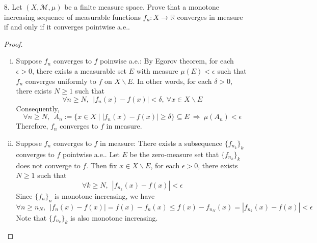 \begin{itemize}
	\item[8.] Let $(X,\mathcal{M}, \mu)$ be a finite measure space. Prove that a monotone increasing sequence
	of measurable functions $f_n : X \rightarrow \mathbb{R}$ converges in measure if and only if it converges pointwise
	a.e..
	\begin{proof}
		\begin{enumerate}[(i)]
			\item Suppose $f_n$ converges to $f$ poinwise a.e.: By Egorov theorem, for each $\epsilon > 0$, there exists a measurable set $E$ with measure $\mu(E) < \epsilon$ such that $f_n$ converges uniformly to $f$ on $X\backslash E$. In other words, for each $\delta > 0$, there exists $N\ge 1$ such that 
			$$
			\forall n\ge N,~~ \lvert f_n(x) - f(x)\rvert < \delta, ~\forall x\in X\backslash E
			$$
			Consequently,
			$$
			\forall n\ge N,~~A_n:=\{x\in X \mid \lvert f_n(x) - f(x)\rvert \ge \delta\} \subseteq E ~\Rightarrow~ \mu(A_n) < \epsilon
			$$
			Therefore, $f_n$ converges to $f$ in measure.
			
			\item Suppose $f_n$ converges to $f$ in measure: There exists a subsequence $\{f_{n_k}\}_k$ converges to $f$ pointwise a.e.. Let $E$ be the zero-measure set that $\{f_{n_k}\}_k$ does not converge to $f$. Then
			fix $x\in X\backslash E$, for each $\epsilon > 0$, there exists $N\ge 1$ such that 
			$$
			\forall k\ge N,~~ |f_{n_k}(x) - f(x)|  < \epsilon
			$$
			Since $\{f_n\}_n$ is monotone increasing, we have
			$$
			\forall n\ge n_N,~~ |f_{n}(x) - f(x)| = f(x) - f_n(x) \le f(x) - f_{n_N}(x)  = |f_{n_k}(x) - f(x)|< \epsilon
			$$ 
			Note that $\{f_{n_k}\}_k$ is also monotone increasing. 
		\end{enumerate}
	\end{proof}


\end{itemize}
